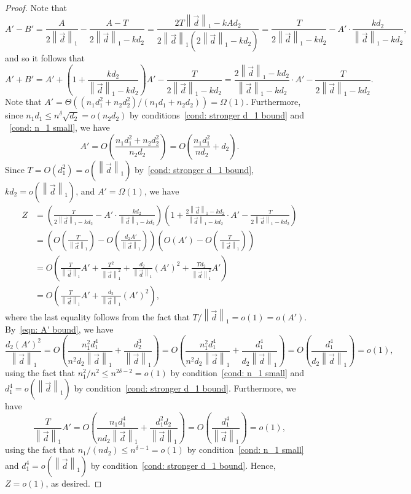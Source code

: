 \documentclass[10pt,a4paper]{amsart}
\newcommand{\norm}[1]{\left\lVert #1 \right\rVert}
\begin{document}
\begin{proof}
Note that
\[
A' - B' = \frac{A}{2\norm{\vec{d}}_1} - \frac{A-T}{2\norm{\vec{d}}_1 - k d_2} = \frac{2T\norm{\vec{d}}_1 - kA d_2}{2\norm{\vec{d}}_1(2\norm{\vec{d}}_1 - k d_2)} = \frac{T}{2\norm{\vec{d}}_1-k d_2} - A'\cdot\frac{k d_2}{\norm{\vec{d}}_1-k d_2},
\]
and so it follows that
\[
A' + B' = A' + \left(1 +\frac{k d_2}{\norm{\vec{d}}_1-k d_2}\right)A' - \frac{T}{2\norm{\vec{d}}_1-k d_2} = \frac{2\norm{\vec{d}}_1 - k d_2}{\norm{\vec{d}}_1 - k d_2}\cdot A' - \frac{T}{2\norm{\vec{d}}_1-k d_2}.
\]
Note that $A' = \Theta((n_1 d_1^2 + n_2 d_2^2)/(n_1 d_1 + n_2 d_2))= \Omega(1)$. Furthermore, since $n_1 d_1 \leq n^{\delta}\sqrt{d_2} = o(n_2 d_2)$ by conditions~\ref{cond: stronger d_1 bound} and ~\ref{cond: n_1 small}, we have
\begin{equation}
\label{eqn: A' bound}
    A' = O\left(\frac{n_1 d_1^2 +n_2 d_2^2}{n_2 d_2}\right) = O\left(\frac{n_1 d_1^2}{nd_2}+ d_2\right).
\end{equation}
Since $T = O(d_1^2) = o(\norm{\vec{d}}_1)$ by~\ref{cond: stronger d_1 bound}, $k d_2 = o(\norm{\vec{d}}_1)$, and $A'=\Omega(1)$, we have
\begin{align*}
    Z &= \left(\frac{T}{2\norm{\vec{d}}_1-k d_2} - A'\cdot\frac{k d_2}{\norm{\vec{d}}_1-k d_2}\right)\left(1 + \frac{2\norm{\vec{d}}_1 - k d_2}{\norm{\vec{d}}_1 - k d_2}\cdot A' - \frac{T}{2\norm{\vec{d}}_1-k d_2}\right)
    \\
    &= \left(O\left(\frac{T}{\norm{\vec{d}}_1}\right) - O\left(\frac{d_2 A'}{\norm{\vec{d}}_1}\right)\right)\left(O\left(A'\right) - O\left(\frac{T}{\norm{\vec{d}}_1}\right)\right)
    \\
    &= O\left(\frac{T}{\norm{\vec{d}}_1} A'+\frac{T^2}{\norm{\vec{d}}_1^2}+\frac{d_2}{\norm{\vec{d}}_1} (A')^2+\frac{T d_2}{\norm{\vec{d}}_1^2} A'\right)
    \\
    &=O\left(\frac{T}{\norm{\vec{d}}_1} A'+\frac{d_2}{\norm{\vec{d}}_1} (A')^2\right),
\end{align*}
where the last equality follows from the fact that $T/\norm{\vec{d}}_1 = o(1) = o(A')$. By~\eqref{eqn: A' bound},
we have
\[
\frac{d_2 (A')^2}{\norm{\vec{d}}_1} = O\left(\frac{n_1^2 d_1^4}{n^2 d_2\norm{\vec{d}}_1} +\frac{d_2^3}{\norm{\vec{d}}_1}\right) = O\left(\frac{n_1^2 d_1^4}{n^2 d_2\norm{\vec{d}}_1} +\frac{d_1^4}{d_2\norm{\vec{d}}_1}\right) = O\left(\frac{d_1^4}{d_2\norm{\vec{d}}_1}\right) = o(1),
\]
using the fact that $n_1^2/n^2\leq n^{2\delta-2} = o(1)$ by condition~\ref{cond: n_1 small} and $d_1^4 = o(\norm{\vec{d}}_1)$ by condition~\ref{cond: stronger d_1 bound}. Furthermore, we have
\[
\frac{T}{\norm{\vec{d}}_1} A' = O\left(\frac{n_1 d_1^4}{n d_2\norm{\vec{d}}_1} + \frac{d_1^2 d_2}{\norm{\vec{d}}_1}\right) = O\left(\frac{d_1^4}{\norm{\vec{d}}_1}\right) = o(1),
\]
using the fact that $n_1/(nd_2)\leq n^{\delta-1} = o(1)$ by condition~\ref{cond: n_1 small} and $d_1^4 = o(\norm{\vec{d}}_1)$  by condition~\ref{cond: stronger d_1 bound}. Hence, $Z = o(1)$, as desired.
\end{proof}
\end{document}
